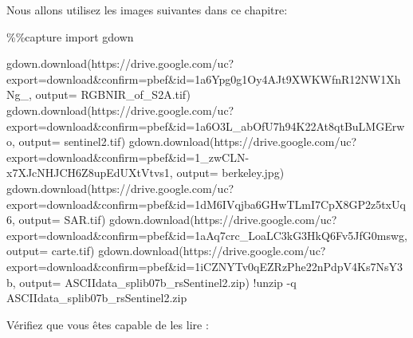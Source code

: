\documentclass[
  11pt,
  letterpaper,
  open=any,
  twoside=false,
  french]{scrbook}
\newenvironment{Shaded}{\begin{snugshade}}{\end{snugshade}}
\newcommand{\BuiltInTok}[1]{\textcolor[rgb]{0.00,0.23,0.31}{#1}}
\newcommand{\ImportTok}[1]{\textcolor[rgb]{0.00,0.46,0.62}{#1}}
\newcommand{\NormalTok}[1]{\textcolor[rgb]{0.00,0.23,0.31}{#1}}
\newcommand{\OperatorTok}[1]{\textcolor[rgb]{0.37,0.37,0.37}{#1}}
\newcommand{\StringTok}[1]{\textcolor[rgb]{0.13,0.47,0.30}{#1}}
\begin{document}
Nous allons utilisez les images suivantes dans ce chapitre:

\begin{Shaded}
\begin{Highlighting}[]
\OperatorTok{\%\%}\NormalTok{capture}
\ImportTok{import}\NormalTok{ gdown}

\NormalTok{gdown.download(}\StringTok{\textquotesingle{}https://drive.google.com/uc?export=download\&confirm=pbef\&id=1a6Ypg0g1Oy4AJt9XWKWfnR12NW1XhNg\_\textquotesingle{}}\NormalTok{, output}\OperatorTok{=} \StringTok{\textquotesingle{}RGBNIR\_of\_S2A.tif\textquotesingle{}}\NormalTok{)}
\NormalTok{gdown.download(}\StringTok{\textquotesingle{}https://drive.google.com/uc?export=download\&confirm=pbef\&id=1a6O3L\_abOfU7h94K22At8qtBuLMGErwo\textquotesingle{}}\NormalTok{, output}\OperatorTok{=} \StringTok{\textquotesingle{}sentinel2.tif\textquotesingle{}}\NormalTok{)}
\NormalTok{gdown.download(}\StringTok{\textquotesingle{}https://drive.google.com/uc?export=download\&confirm=pbef\&id=1\_zwCLN{-}x7XJcNHJCH6Z8upEdUXtVtvs1\textquotesingle{}}\NormalTok{, output}\OperatorTok{=} \StringTok{\textquotesingle{}berkeley.jpg\textquotesingle{}}\NormalTok{)}
\NormalTok{gdown.download(}\StringTok{\textquotesingle{}https://drive.google.com/uc?export=download\&confirm=pbef\&id=1dM6IVqjba6GHwTLmI7CpX8GP2z5txUq6\textquotesingle{}}\NormalTok{, output}\OperatorTok{=} \StringTok{\textquotesingle{}SAR.tif\textquotesingle{}}\NormalTok{)}
\NormalTok{gdown.download(}\StringTok{\textquotesingle{}https://drive.google.com/uc?export=download\&confirm=pbef\&id=1aAq7crc\_LoaLC3kG3HkQ6Fv5JfG0mswg\textquotesingle{}}\NormalTok{, output}\OperatorTok{=} \StringTok{\textquotesingle{}carte.tif\textquotesingle{}}\NormalTok{)}
\NormalTok{gdown.download(}\StringTok{\textquotesingle{}https://drive.google.com/uc?export=download\&confirm=pbef\&id=1iCZNYTv0qEZRzPhe22nPdpV4Ks7NsY3b\textquotesingle{}}\NormalTok{, output}\OperatorTok{=} \StringTok{\textquotesingle{}ASCIIdata\_splib07b\_rsSentinel2.zip\textquotesingle{}}\NormalTok{)}
\OperatorTok{!}\NormalTok{unzip }\OperatorTok{{-}}\NormalTok{q ASCIIdata\_splib07b\_rsSentinel2.}\BuiltInTok{zip}
\end{Highlighting}
\end{Shaded}

Vérifiez que vous êtes capable de les lire :
\end{document}
